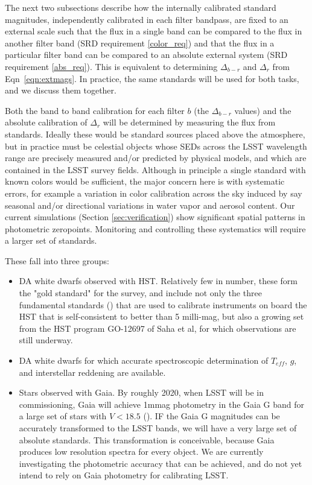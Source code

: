 \documentclass[12pt,preprint]{aastex}
\begin{document}
The next two subsections describe how the internally calibrated
standard magnitudes, independently calibrated in each filter bandpass, are fixed
to an external scale such that the flux in a single band can be compared to the
flux in another filter band (SRD requirement \ref{color_req}) and that
the flux in a particular filter band can be compared to an absolute
external system (SRD requirement \ref{abs_req}). This is equivalent to
determining $\Delta_{b-r}$ and $\Delta_r$ from Eqn~\ref{eqn:extmags}. In practice, the same 
standards will be used for both tasks, and we discuss them together.

Both the band to band calibration for each filter $b$ (the $\Delta_{b-r}$
values) and the absolute calibration of $\Delta_r$ will be determined by measuring the flux from standards.
Ideally these would be standard sources placed above the atmosphere, but in practice must be celestial objects whose SEDs across the LSST wavelength range are precisely measured and/or
predicted by physical models, and which are contained in the LSST
survey fields.
Although in principle a single standard with known colors would be
sufficient, the major concern here is with systematic errors, for
example a variation in color calibration across the sky induced by say seasonal and/or directional variations in water vapor and aerosol content.   Our current simulations (Section \ref{sec:verification})
show significant spatial patterns in photometric zeropoints.  Monitoring
and controlling these
systematics will require a larger set of standards.

These fall into three groups:
\begin{itemize}
\item {DA white dwarfs observed with HST.  Relatively few in number, these form the "gold standard" for the survey,
and include not only the three fundamental standards (\citep{Bohlin2004}) that are used to calibrate instruments on board the HST that is self-consistent to better than 5 milli-mag, but also a growing set from
the HST program GO-12697 of Saha et al,  for which observations are still underway.}
\item {DA white dwarfs for which accurate spectroscopic determination of $T_{eff}$, $g$, and interstellar
reddening are available.}
\item {Stars observed with Gaia.  By roughly 2020, when LSST will be in commissioning, 
Gaia will achieve 1mmag photometry in the Gaia G band 
for a large set of stars with $V < 18.5$ (\citep{Jordi2010}).  IF the Gaia G magnitudes can be accurately
transformed to the LSST bands, we will have a very large set of absolute standards.  This transformation 
is conceivable, because Gaia produces low resolution spectra for every object.  We are currently
investigating the photometric accuracy that can be achieved, and do not yet intend to rely on Gaia
photometry for calibrating LSST.}
\end{itemize}
\end{document}
